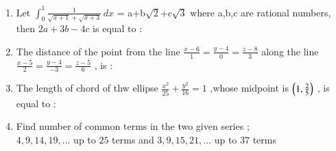 \documentclass[journal,12pt,onecolumn]{IEEEtran}
\theoremstyle{remark}
\begin{document}
\begin{enumerate}
\item Let $ \int_0^1 \frac{1}{\sqrt{x+1}+\sqrt{x+3}} \, dx $ = a+b$ \sqrt{2} $+$ c\sqrt{3} $ where a,b,c are rational numbers, then  $ 2a+3b-4c $ is equal to :
        
\hfill{}  
\begin{enumerate}
\end{enumerate}

\item The distance of the point  from the line $ \frac{x-6}{1}=\frac{y-4}{0}=\frac{z-8}{3} $ along the line $ \frac{x-5}{2}=\frac{y-4}{-3}=\frac{z-5}{6} $ , is :

\hfill{}
\begin{enumerate}   
\end{enumerate}

\item The length of chord of thw ellipse $ \frac{x^2}{25} + \frac{y^2}{16} = 1 $ ,whose midpoint is $ \left(1,\frac{2}{5}\right) $ , is equal to :

\hfill{}
\begin{enumerate}
\end{enumerate}

\item Find number of common terms in the two given series ; \\ $ 4, 9, 14, 19,... $ up to $ 25 $ terms and $ 3, 9, 15, 21,... $ up to $ 37 $ terms


\end{enumerate}
\end{document}
